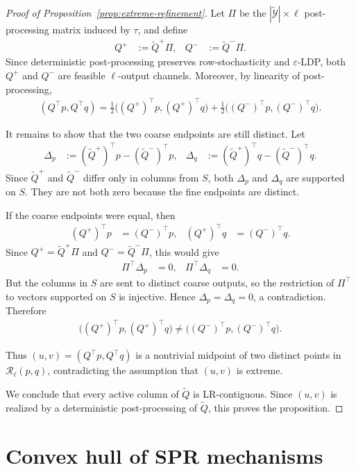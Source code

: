 \documentclass{article}
\theoremstyle{plain}
\theoremstyle{definition}
\theoremstyle{plain}
\begin{document}
\begin{proof}[Proof of Proposition~\ref{prop:extreme-refinement}]
Let $\Pi$ be the $|\widetilde{\mathcal Y}|\times \ell$ post-processing matrix induced by $\tau$, and define
\begin{align*}
    Q^+ &:= \widetilde Q^+\Pi, & Q^- &:= \widetilde Q^-\Pi.
\end{align*}
Since deterministic post-processing preserves row-stochasticity and $\varepsilon$-LDP, both $Q^+$ and $Q^-$ are feasible $\ell$-output channels. Moreover, by linearity of post-processing,
\begin{align*}
    (Q^\top p,Q^\top q) = \tfrac12\bigl((Q^+)^\top p,(Q^+)^\top q\bigr) + \tfrac12\bigl((Q^-)^\top p,(Q^-)^\top q\bigr).
\end{align*}

It remains to show that the two coarse endpoints are still distinct. Let
\begin{align*}
    \Delta_p &:= (\widetilde Q^+)^\top p-(\widetilde Q^-)^\top p, & \Delta_q &:= (\widetilde Q^+)^\top q-(\widetilde Q^-)^\top q.
\end{align*}
Since $\widetilde Q^+$ and $\widetilde Q^-$ differ only in columns from $S$, both $\Delta_p$ and $\Delta_q$ are supported on $S$. They are not both zero because the fine endpoints are distinct.

If the coarse endpoints were equal, then
\begin{align*}
    (Q^+)^\top p &= (Q^-)^\top p, & (Q^+)^\top q &= (Q^-)^\top q.
\end{align*}
Since $Q^+=\widetilde Q^+\Pi$ and $Q^-=\widetilde Q^-\Pi$, this would give
\begin{align*}
    \Pi^\top \Delta_p &= 0, & \Pi^\top \Delta_q &= 0.
\end{align*}
But the columns in $S$ are sent to distinct coarse outputs, so the restriction of $\Pi^\top$ to vectors supported on $S$ is injective. Hence $\Delta_p=\Delta_q=0$, a contradiction. Therefore
\begin{align*}
    \bigl((Q^+)^\top p,(Q^+)^\top q\bigr)\neq \bigl((Q^-)^\top p,(Q^-)^\top q\bigr).
\end{align*}

Thus $(u,v)=(Q^\top p,Q^\top q)$ is a nontrivial midpoint of two distinct points in $\mathcal R_\ell(p,q)$, contradicting the assumption that $(u,v)$ is extreme.

We conclude that every active column of $\widetilde Q$ is LR-contiguous. Since $(u,v)$ is realized by a deterministic post-processing of $\widetilde Q$, this proves the proposition.
\end{proof}
\section{Convex hull of SPR mechanisms}
\label{sec:proof-convex-hull-partition-rr}
\end{document}
